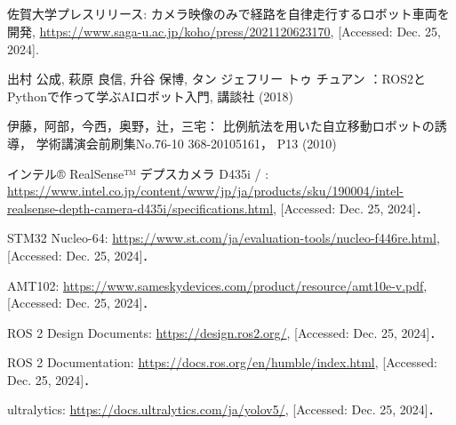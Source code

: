 \begin{center}
	\section*{}                      %
	\vspace*{-2zh}
\end{center}

\begin{thebibliography}{99}
	
	佐賀大学プレスリリース:
	カメラ映像のみで経路を自律走行するロボット車両を開発, 
	\url{https://www.saga-u.ac.jp/koho/press/2021120623170}, 
	[Accessed: Dec. 25, 2024].
	
	出村 公成, 萩原 良信, 升谷 保博, タン ジェフリー トゥ チュアン
	：ROS2とPythonで作って学ぶAIロボット入門, 
	講談社 (2018)
	
	伊藤，阿部，今西，奥野，辻，三宅：
	比例航法を用いた自立移動ロボットの誘導，
	学術講演会前刷集No.76-10 368-20105161，
	P13 (2010)
	
	インテル® RealSense™ デプスカメラ D435i /
	: \url{https://www.intel.co.jp/content/www/jp/ja/products/sku/190004/intel-realsense-depth-camera-d435i/specifications.html}, [Accessed: Dec. 25, 2024]．
	
	STM32 Nucleo-64: \url{https://www.st.com/ja/evaluation-tools/nucleo-f446re.html}, [Accessed: Dec. 25, 2024]．
	
	AMT102: \url{https://www.sameskydevices.com/product/resource/amt10e-v.pdf}, [Accessed: Dec. 25, 2024]．
	
	ROS 2 Design Documents: \url{https://design.ros2.org/}, [Accessed: Dec. 25, 2024]．
	
	ROS 2 Documentation: \url{https://docs.ros.org/en/humble/index.html}, [Accessed: Dec. 25, 2024]．
	
	ultralytics: \url{https://docs.ultralytics.com/ja/yolov5/}, [Accessed: Dec. 25, 2024]．
	
\end{thebibliography}
